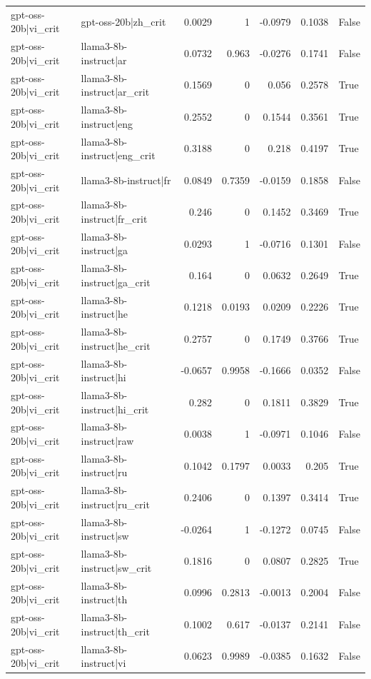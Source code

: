 \begin{table}
\begin{tabular}{l l r r r r l}
gpt-oss-20b|vi_crit & gpt-oss-20b|zh_crit & 0.0029 & 1 & -0.0979 & 0.1038 & False \\
gpt-oss-20b|vi_crit & llama3-8b-instruct|ar & 0.0732 & 0.963 & -0.0276 & 0.1741 & False \\
gpt-oss-20b|vi_crit & llama3-8b-instruct|ar_crit & 0.1569 & 0 & 0.056 & 0.2578 & True \\
gpt-oss-20b|vi_crit & llama3-8b-instruct|eng & 0.2552 & 0 & 0.1544 & 0.3561 & True \\
gpt-oss-20b|vi_crit & llama3-8b-instruct|eng_crit & 0.3188 & 0 & 0.218 & 0.4197 & True \\
gpt-oss-20b|vi_crit & llama3-8b-instruct|fr & 0.0849 & 0.7359 & -0.0159 & 0.1858 & False \\
gpt-oss-20b|vi_crit & llama3-8b-instruct|fr_crit & 0.246 & 0 & 0.1452 & 0.3469 & True \\
gpt-oss-20b|vi_crit & llama3-8b-instruct|ga & 0.0293 & 1 & -0.0716 & 0.1301 & False \\
gpt-oss-20b|vi_crit & llama3-8b-instruct|ga_crit & 0.164 & 0 & 0.0632 & 0.2649 & True \\
gpt-oss-20b|vi_crit & llama3-8b-instruct|he & 0.1218 & 0.0193 & 0.0209 & 0.2226 & True \\
gpt-oss-20b|vi_crit & llama3-8b-instruct|he_crit & 0.2757 & 0 & 0.1749 & 0.3766 & True \\
gpt-oss-20b|vi_crit & llama3-8b-instruct|hi & -0.0657 & 0.9958 & -0.1666 & 0.0352 & False \\
gpt-oss-20b|vi_crit & llama3-8b-instruct|hi_crit & 0.282 & 0 & 0.1811 & 0.3829 & True \\
gpt-oss-20b|vi_crit & llama3-8b-instruct|raw & 0.0038 & 1 & -0.0971 & 0.1046 & False \\
gpt-oss-20b|vi_crit & llama3-8b-instruct|ru & 0.1042 & 0.1797 & 0.0033 & 0.205 & True \\
gpt-oss-20b|vi_crit & llama3-8b-instruct|ru_crit & 0.2406 & 0 & 0.1397 & 0.3414 & True \\
gpt-oss-20b|vi_crit & llama3-8b-instruct|sw & -0.0264 & 1 & -0.1272 & 0.0745 & False \\
gpt-oss-20b|vi_crit & llama3-8b-instruct|sw_crit & 0.1816 & 0 & 0.0807 & 0.2825 & True \\
gpt-oss-20b|vi_crit & llama3-8b-instruct|th & 0.0996 & 0.2813 & -0.0013 & 0.2004 & False \\
gpt-oss-20b|vi_crit & llama3-8b-instruct|th_crit & 0.1002 & 0.617 & -0.0137 & 0.2141 & False \\
gpt-oss-20b|vi_crit & llama3-8b-instruct|vi & 0.0623 & 0.9989 & -0.0385 & 0.1632 & False \\

\end{tabular}
\end{table}
